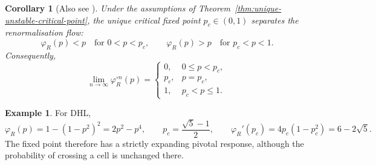 \documentclass[scheme=plain,11pt]{ctexart}
\newtheorem{corollary}[theorem]{Corollary}
\theoremstyle{definition}
\newtheorem{example}[theorem]{Example}
\theoremstyle{remark}
\begin{document}
\begin{corollary}[Also see \cite{alves2026percolation}]
\label{cor:global-renormalisation-dichotomy}
Under the assumptions of Theorem~\ref{thm:unique-unstable-critical-point},
the unique critical fixed point \(p_c\in(0,1)\) separates the renormalisation
flow:
\[
    \varphi_R(p)<p
    \quad\text{for }0<p<p_c,
    \qquad
    \varphi_R(p)>p
    \quad\text{for }p_c<p<1.
\]
Consequently,
\[
    \displaystyle\lim_{n\to\infty}\varphi_R^{\circ n}(p)
    =
    \begin{cases}
        0, & 0\le p<p_c,\\[2mm]
        p_c, & p=p_c,\\[2mm]
        1, & p_c<p\le 1.
    \end{cases}
\]
\end{corollary}








\begin{example}\label{ex:dhl-reliability}
For DHL,
\[
 \varphi_R(p)=1-(1-p^2)^2=2p^2-p^4,\qquad
 p_c=\frac{\sqrt5-1}{2},\qquad
 \varphi_R'(p_c)=4p_c(1-p_c^2)=6-2\sqrt5.
\]
The fixed point therefore has a strictly expanding pivotal response, although the probability of crossing a cell is unchanged there.
\end{example}
\end{document}
